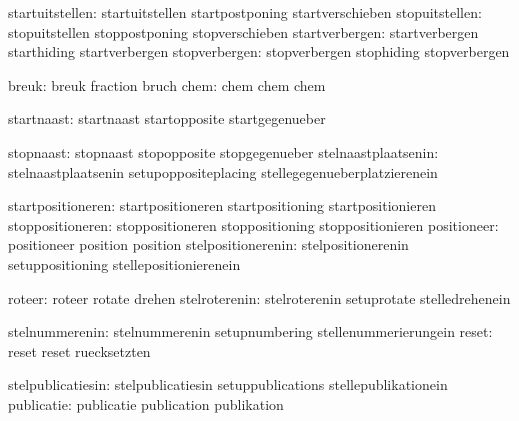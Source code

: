               startuitstellen:  startuitstellen              startpostponing
                                startverschieben
               stopuitstellen:  stopuitstellen               stoppostponing
                                stopverschieben
               startverbergen:  startverbergen               starthiding
                                startverbergen
                stopverbergen:  stopverbergen                stophiding
                                stopverbergen

                        breuk:  breuk                        fraction
                                bruch
                         chem:  chem                         chem
                                chem

                   startnaast:  startnaast                   startopposite
                                startgegenueber

                    stopnaast:  stopnaast                    stopopposite
                                stopgegenueber
          stelnaastplaatsenin:  stelnaastplaatsenin          setupoppositeplacing
                                stellegegenueberplatzierenein

            startpositioneren:  startpositioneren            startpositioning
                                startpositionieren
             stoppositioneren:  stoppositioneren             stoppositioning
                                stoppositionieren
                  positioneer:  positioneer                  position
                                position
           stelpositionerenin:  stelpositionerenin           setuppositioning
                                stellepositionierenein

                       roteer:  roteer                       rotate
                                drehen
                stelroterenin:  stelroterenin                setuprotate
                                stelledrehenein

               stelnummerenin:  stelnummerenin               setupnumbering
                                stellenummerierungein
                        reset:  reset                        reset
                                ruecksetzten

            stelpublicatiesin:  stelpublicatiesin            setuppublications
                                stellepublikationein
                   publicatie:  publicatie                   publication
                                publikation


